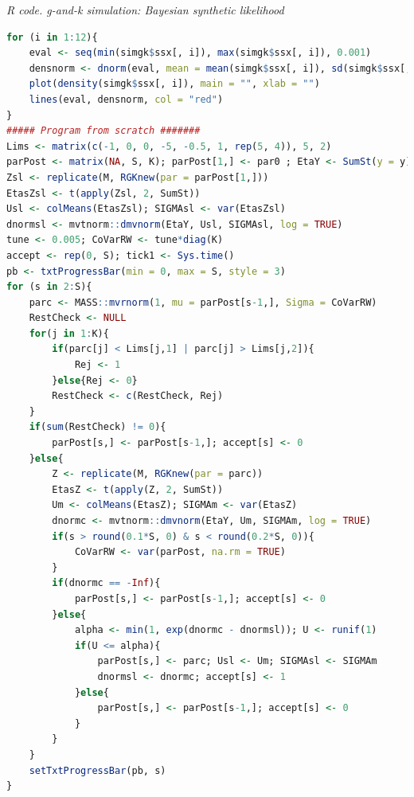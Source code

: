 \begin{tcolorbox}[enhanced,width=4.67in,center upper,
	fontupper=\large\bfseries,drop shadow southwest,sharp corners]
	\textit{R code. g-and-k simulation: Bayesian synthetic likelihood}
	\begin{VF}
		\begin{lstlisting}[language=R]
for (i in 1:12){
	eval <- seq(min(simgk$ssx[, i]), max(simgk$ssx[, i]), 0.001)
	densnorm <- dnorm(eval, mean = mean(simgk$ssx[, i]), sd(simgk$ssx[, i])) 
	plot(density(simgk$ssx[, i]), main = "", xlab = "")
	lines(eval, densnorm, col = "red")
}
##### Program from scratch #######
Lims <- matrix(c(-1, 0, 0, -5, -0.5, 1, rep(5, 4)), 5, 2)
parPost <- matrix(NA, S, K); parPost[1,] <- par0 ; EtaY <- SumSt(y = y)
Zsl <- replicate(M, RGKnew(par = parPost[1,]))
EtasZsl <- t(apply(Zsl, 2, SumSt))
Usl <- colMeans(EtasZsl); SIGMAsl <- var(EtasZsl)
dnormsl <- mvtnorm::dmvnorm(EtaY, Usl, SIGMAsl, log = TRUE)
tune <- 0.005; CoVarRW <- tune*diag(K)
accept <- rep(0, S); tick1 <- Sys.time()
pb <- txtProgressBar(min = 0, max = S, style = 3)
for (s in 2:S){
	parc <- MASS::mvrnorm(1, mu = parPost[s-1,], Sigma = CoVarRW)
	RestCheck <- NULL
	for(j in 1:K){
		if(parc[j] < Lims[j,1] | parc[j] > Lims[j,2]){
			Rej <- 1
		}else{Rej <- 0}
		RestCheck <- c(RestCheck, Rej)
	}
	if(sum(RestCheck) != 0){
		parPost[s,] <- parPost[s-1,]; accept[s] <- 0
	}else{
		Z <- replicate(M, RGKnew(par = parc))
		EtasZ <- t(apply(Z, 2, SumSt))
		Um <- colMeans(EtasZ); SIGMAm <- var(EtasZ)
		dnormc <- mvtnorm::dmvnorm(EtaY, Um, SIGMAm, log = TRUE)
		if(s > round(0.1*S, 0) & s < round(0.2*S, 0)){
			CoVarRW <- var(parPost, na.rm = TRUE)
		}
		if(dnormc == -Inf){
			parPost[s,] <- parPost[s-1,]; accept[s] <- 0
		}else{
			alpha <- min(1, exp(dnormc - dnormsl)); U <- runif(1)
			if(U <= alpha){
				parPost[s,] <- parc; Usl <- Um; SIGMAsl <- SIGMAm
				dnormsl <- dnormc; accept[s] <- 1
			}else{
				parPost[s,] <- parPost[s-1,]; accept[s] <- 0
			}
		}
	}
	setTxtProgressBar(pb, s)
}
\end{lstlisting}
	\end{VF}
\end{tcolorbox}

